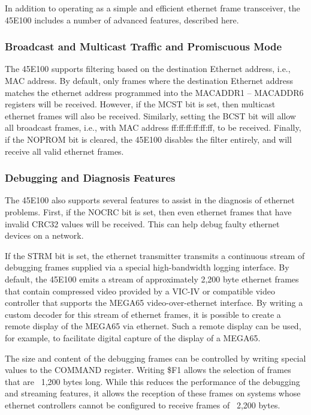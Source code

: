 In addition to operating as a simple and efficient ethernet frame transceiver, the 45E100
includes a number of advanced features, described here.

\subsubsection{Broadcast and Multicast Traffic and Promiscuous Mode}

The 45E100 supports filtering based on the destination Ethernet address, i.e., MAC address.
By default, only frames where the destination Ethernet address matches the ethernet address
programmed into the MACADDR1 -- MACADDR6 registers will be received. However, if the MCST bit
is set, then multicast ethernet frames will also be received. Similarly, setting the BCST bit
will allow all broadcast frames, i.e., with MAC address ff:ff:ff:ff:ff:ff, to be received.
Finally, if the NOPROM bit is cleared, the 45E100 disables the filter entirely, and will
receive all valid ethernet frames.

\subsubsection{Debugging and Diagnosis Features}

The 45E100 also supports several features to assist in the diagnosis of ethernet problems.
First, if the NOCRC bit is set, then even ethernet frames that have invalid CRC32 values
will be received. This can help debug faulty ethernet devices on a network.

If the STRM bit is set, the ethernet transmitter transmits a continuous stream of debugging frames
supplied via a special high-bandwidth logging interface. By default, the 45E100 emits a
stream of approximately 2,200 byte ethernet frames that contain compressed video provided
by a VIC-IV or compatible video controller that supports the MEGA65 video-over-ethernet
interface.  By writing a custom decoder for this stream of ethernet frames, it is possible
to create a remote display of the MEGA65 via ethernet. Such a remote display can be used,
for example, to facilitate digital capture of the display of a MEGA65.

The size and content of the debugging frames can be controlled by writing special values to the
COMMAND register.  Writing \$F1 allows the selection of frames that are ~1,200 bytes long.
While this reduces the performance of the debugging and streaming features, it allows the reception
of these frames on systems whose ethernet controllers cannot be configured to receive frames
of ~2,200 bytes.

